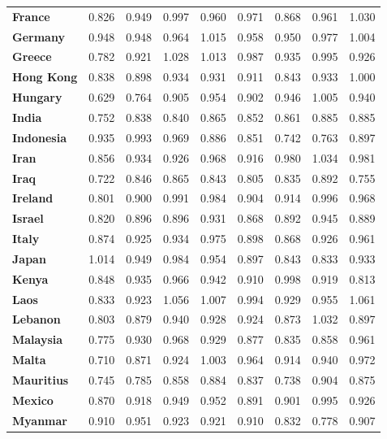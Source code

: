 \begin{table}
{\begin{tabular}{lllllllll}
    \textbf{France} & 0.826 & 0.949 & 0.997 & 0.960 & 0.971 & 0.868 & 0.961 & 1.030 \\
    \textbf{Germany} & 0.948 & 0.948 & 0.964 & 1.015 & 0.958 & 0.950 & 0.977 & 1.004 \\
    \textbf{Greece} & 0.782 & 0.921 & 1.028 & 1.013 & 0.987 & 0.935 & 0.995 & 0.926 \\
    \textbf{Hong Kong} & 0.838 & 0.898 & 0.934 & 0.931 & 0.911 & 0.843 & 0.933 & 1.000 \\
    \textbf{Hungary} & 0.629 & 0.764 & 0.905 & 0.954 & 0.902 & 0.946 & 1.005 & 0.940 \\
    \textbf{India} & 0.752 & 0.838 & 0.840 & 0.865 & 0.852 & 0.861 & 0.885 & 0.885 \\
    \textbf{Indonesia} & 0.935 & 0.993 & 0.969 & 0.886 & 0.851 & 0.742 & 0.763 & 0.897 \\
    \textbf{Iran} & 0.856 & 0.934 & 0.926 & 0.968 & 0.916 & 0.980 & 1.034 & 0.981 \\
    \textbf{Iraq} & 0.722 & 0.846 & 0.865 & 0.843 & 0.805 & 0.835 & 0.892 & 0.755 \\
    \textbf{Ireland} & 0.801 & 0.900 & 0.991 & 0.984 & 0.904 & 0.914 & 0.996 & 0.968 \\
    \textbf{Israel} & 0.820 & 0.896 & 0.896 & 0.931 & 0.868 & 0.892 & 0.945 & 0.889 \\
    \textbf{Italy} & 0.874 & 0.925 & 0.934 & 0.975 & 0.898 & 0.868 & 0.926 & 0.961 \\
    \textbf{Japan} & 1.014 & 0.949 & 0.984 & 0.954 & 0.897 & 0.843 & 0.833 & 0.933 \\
    \textbf{Kenya} & 0.848 & 0.935 & 0.966 & 0.942 & 0.910 & 0.998 & 0.919 & 0.813 \\
    \textbf{Laos} & 0.833 & 0.923 & 1.056 & 1.007 & 0.994 & 0.929 & 0.955 & 1.061 \\
    \textbf{Lebanon} & 0.803 & 0.879 & 0.940 & 0.928 & 0.924 & 0.873 & 1.032 & 0.897 \\
    \textbf{Malaysia} & 0.775 & 0.930 & 0.968 & 0.929 & 0.877 & 0.835 & 0.858 & 0.961 \\
    \textbf{Malta} & 0.710 & 0.871 & 0.924 & 1.003 & 0.964 & 0.914 & 0.940 & 0.972 \\
    \textbf{Mauritius} & 0.745 & 0.785 & 0.858 & 0.884 & 0.837 & 0.738 & 0.904 & 0.875 \\
    \textbf{Mexico} & 0.870 & 0.918 & 0.949 & 0.952 & 0.891 & 0.901 & 0.995 & 0.926 \\
    \textbf{Myanmar} & 0.910 & 0.951 & 0.923 & 0.921 & 0.910 & 0.832 & 0.778 & 0.907 \\

\end{tabular}}
\end{table}
